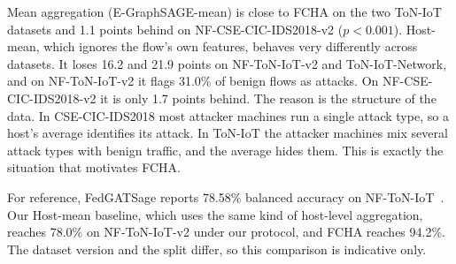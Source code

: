 \documentclass[pdflatex,sn-mathphys-num]{sn-jnl}
\begin{document}
Mean aggregation (E-GraphSAGE-mean) is close to FCHA on the two ToN-IoT datasets and 1.1 points behind on NF-CSE-CIC-IDS2018-v2 ($p<0.001$). Host-mean, which ignores the flow's own features, behaves very differently across datasets. It loses 16.2 and 21.9 points on NF-ToN-IoT-v2 and ToN-IoT-Network, and on NF-ToN-IoT-v2 it flags 31.0\% of benign flows as attacks. On NF-CSE-CIC-IDS2018-v2 it is only 1.7 points behind. The reason is the structure of the data. In CSE-CIC-IDS2018 most attacker machines run a single attack type, so a host's average identifies its attack. In ToN-IoT the attacker machines mix several attack types with benign traffic, and the average hides them. This is exactly the situation that motivates FCHA.

For reference, FedGATSage reports 78.58\% balanced accuracy on NF-ToN-IoT~\cite{altfaily2025fedgatsage}. Our Host-mean baseline, which uses the same kind of host-level aggregation, reaches 78.0\% on NF-ToN-IoT-v2 under our protocol, and FCHA reaches 94.2\%. The dataset version and the split differ, so this comparison is indicative only.
\end{document}

